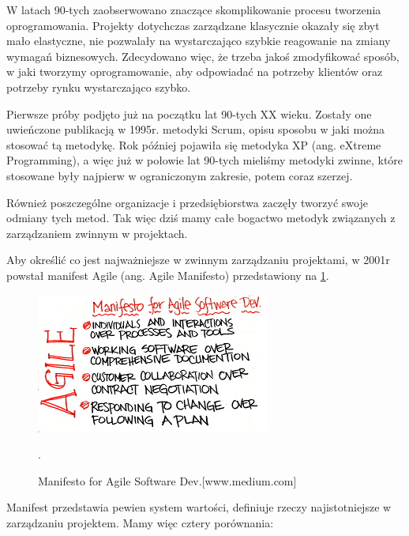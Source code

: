 W latach 90-tych zaobserwowano znaczące skomplikowanie procesu tworzenia oprogramowania.
Projekty dotychczas zarządzane klasycznie okazały się zbyt mało elastyczne,
nie pozwalały na wystarczająco szybkie reagowanie na zmiany wymagań biznesowych.
Zdecydowano więc, że trzeba jakoś zmodyfikować sposób, w jaki tworzymy oprogramowanie,
aby odpowiadać na potrzeby klientów oraz potrzeby rynku wystarczająco szybko.

Pierwsze próby podjęto już na początku lat 90-tych XX wieku. Zostały one uwieńczone publikacją w 1995r.
metodyki Scrum, opisu sposobu w jaki można stosować tą metodykę.
Rok później pojawiła się metodyka XP (ang. eXtreme Programming),
a więc już w połowie lat 90-tych mieliśmy metodyki zwinne, które stosowane były
najpierw w ograniczonym zakresie, potem coraz szerzej.

Również poszczególne organizacje i przedsiębiorstwa zaczęły tworzyć swoje odmiany tych metod.
Tak więc dziś mamy całe bogactwo metodyk związanych z zarządzaniem zwinnym w projektach.

Aby określić co jest najważniejsze w zwinnym zarządzaniu projektami, w 2001r powstał manifest Agile
(ang. Agile Manifesto) przedstawiony na \ref{rys:agile}.

\begin{figure}
	\centering\includegraphics[width=.6\textwidth]{img/agile}
	\caption{Manifesto for Agile Software Dev.[www.medium.com]}.
	\label{rys:agile}
\end{figure}

Manifest przedstawia pewien system wartości, definiuje rzeczy najistotniejsze w zarządzaniu projektem.
Mamy więc cztery porównania:

